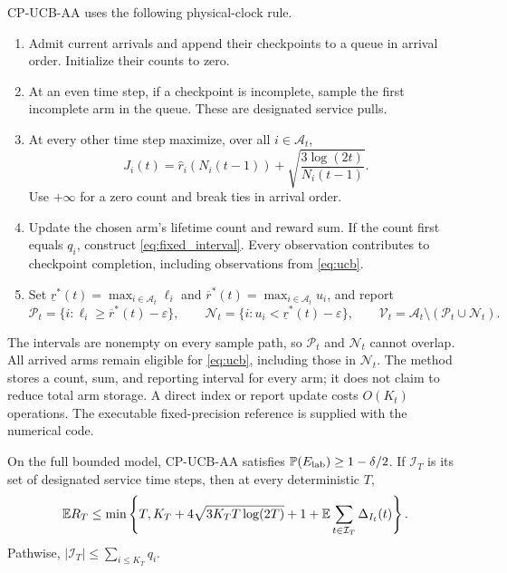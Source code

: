 \documentclass[11pt]{article}
\begin{document}
CP-UCB-AA uses the following physical-clock rule.
\begin{enumerate}
\item Admit current arrivals and append their checkpoints to a queue in arrival
order. Initialize their counts to zero.
\item At an even time step, if a checkpoint is incomplete, sample the first
incomplete arm in the queue. These are designated service pulls.
\item At every other time step maximize, over all $i\in \mathcal{A}_t$,
\begin{equation}
 J_i(t)=\hat r_i(N_i(t-1))+
             \sqrt{\frac{3\log(2t)}{N_i(t-1)}}.
 \label{eq:ucb}
\end{equation}
Use $+\infty$ for a zero count and break ties in arrival order.
\item Update the chosen arm's lifetime count and reward sum. If the count first
equals $q_i$, construct \eqref{eq:fixed_interval}. Every observation contributes
to checkpoint completion, including observations from \eqref{eq:ucb}.
\item Set $\underline r^*(t)=\max_{i\in \mathcal{A}_t}\ell_i$ and
$\overline r^*(t)=\max_{i\in \mathcal{A}_t}u_i$, and report
\begin{equation}
 \mathcal P_t=\{i:\ell_i\ge\overline r^*(t)-\varepsilon\},\qquad
 \mathcal N_t=\{i:u_i<\underline r^*(t)-\varepsilon\},\qquad
 \mathcal V_t=\mathcal{A}_t\setminus(\mathcal P_t\cup \mathcal N_t).
 \label{eq:reports}
\end{equation}
\end{enumerate}
The intervals are nonempty on every sample path, so $\mathcal P_t$ and $\mathcal N_t$ cannot
overlap. All arrived arms remain eligible for \eqref{eq:ucb}, including those
in $\mathcal N_t$. The method stores a count, sum, and reporting interval for every arm;
it does not claim to reduce total arm storage. A direct index or report update
costs $O(K_t)$ operations. The executable fixed-precision reference is supplied
with the numerical code.

\begin{proposition}
\label{prop:reporting}
On the full bounded model, CP-UCB-AA satisfies
$\mathbb P(E_{\rm lab})\ge1-\delta/2$. If $\mathcal I_T$ is its set of designated
service time steps, then at every deterministic $T$,
\begin{equation}
 \mathbb E R_T\le\min\left\{T,K_T+4\sqrt{3K_TT\log(2T)}+1+
                \mathbb E\sum_{t\in\mathcal I_T}\Delta_{I_t}(t)\right\}.
 \label{eq:reward_bound}
\end{equation}
Pathwise, $|\mathcal I_T|\le\sum_{i\le K_T}q_i$.
\end{proposition}
\end{document}
